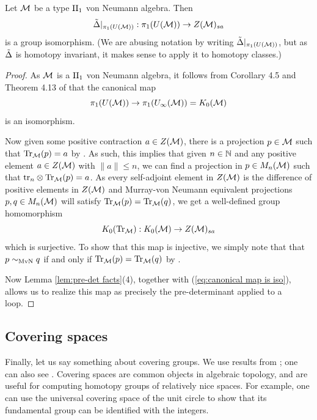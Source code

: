 \documentclass{amsart}
\begin{document}
\begin{lemma}\label{lem:fundamental group is center}
Let $\mathcal{M}$ be a type $\text{II}_1$ von Neumann algebra. Then
\begin{equation}
\tilde{\Delta}|_{\pi_1(U(\mathcal{M}))}: \pi_1(U(\mathcal{M})) \to Z(\mathcal{M})_{sa}
\end{equation}
is a group isomorphism. (We are abusing notation by writing $\tilde{\Delta}|_{\pi_1(U(\mathcal{M}))}$, but as $\tilde{\Delta}$ is homotopy invariant, it makes sense to apply it to homotopy classes.)
\begin{proof}
As $\mathcal{M}$ is a $\text{II}_1$ von Neumann algebra, it follows from Corollary 4.5 and Theorem 4.13 of \cite{Rieffel87} that the canonical map
\begin{equation}\label{eq:canonical map is iso}
\pi_1(U(\mathcal{M})) \to \pi_1(U_{\infty}(\mathcal{M})) = K_0(\mathcal{M})
\end{equation}
is an isomorphism. 

Now given some positive contraction $a \in Z(\mathcal{M})$, there is a projection $p \in \mathcal{M}$ such that $\text{Tr}_{\mathcal{M}}(p) = a$ by \cite[Theorem 8.4.4(ii)]{KadisonRingroseII}.
As such, this implies that given $n \in \mathbb{N}$ and any positive element $a \in Z(\mathcal{M})$ with $\|a\| \leq n$, we can find a projection in $p \in M_n(\mathcal{M})$ such that $\text{tr}_n \otimes \text{Tr}_{\mathcal{M}}(p) = a$. 
As every self-adjoint element in $Z(\mathcal{M})$ is the difference of positive elements in $Z(\mathcal{M})$ and Murray-von Neumann equivalent projections $p,q \in M_n(\mathcal{M})$ will satisfy $\text{Tr}_{\mathcal{M}}(p) = \text{Tr}_{\mathcal{M}}(q)$, we get a well-defined group homomorphism
\begin{equation}
K_0(\text{Tr}_{\mathcal{M}}): K_0(\mathcal{M}) \to Z(\mathcal{M})_{sa}
\end{equation}
which is surjective.
To show that this map is injective, we simply note that that $p \sim_{\text{MvN}} q$ if and only if $\text{Tr}_{\mathcal{M}}(p) = \text{Tr}_{\mathcal{M}}(q)$ by \cite[Theorem 8.4.3(iii)]{KadisonRingroseII}.

Now Lemma \ref{lem:pre-det facts}(4), together with (\ref{eq:canonical map is iso}), allows us to realize this map as precisely the pre-determinant applied to a loop.
\end{proof}
\end{lemma}
 
\subsection{Covering spaces}
Finally, let us say something about covering groups.
We use results from \cite[Chapter 10]{RotmanATBook}; one can also see \cite[Chapter 1.3]{HatcherAT}.
Covering spaces are common objects in algebraic topology, and are useful for computing homotopy groups of relatively nice spaces.
For example, one can use the universal covering space of the unit circle to show that its fundamental group can be identified with the integers.
\end{document}
